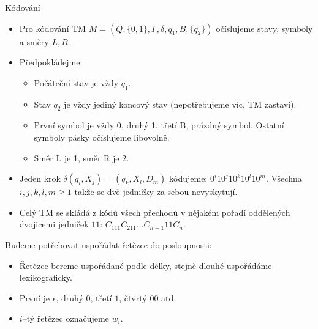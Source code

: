     
    \begin{frame}{Kódování}
    
    \begin{itemize}[<+->]
        \item Pro kódování TM $M=(Q,\{0,1\},\Gamma, \delta,q_1,B,\{q_2\})$ očíslujeme stavy, symboly a směry $L,R$.
    \item Předpokládejme:
    \begin{itemize}
        \item Počáteční stav je vždy $q_1$.
        \item Stav $q_2$ je vždy jediný koncový stav (nepotřebujeme víc, TM zastaví).
        \item První symbol je vždy 0, druhý 1, třetí B, prázdný symbol. Ostatní symboly pásky očíslujeme libovolně.
        \item Směr L je 1, směr R je 2.
    \end{itemize}
    \item Jeden krok $\delta(q_i,X_j)=(q_k,X_l,D_m)$ kódujeme: $0^i10^j10^k10^l10^m$. Všechna $i,j,k,l,m\geq 1$ takže se dvě jedničky za sebou nevyskytují.
    \item Celý TM se skládá z kódů všech přechodů v nějakém pořadí oddělených dvojicemi jedniček $11$: $C_111C_211\ldots C_{n-1}11C_n$.
    \end{itemize}\pause
    Budeme potřebovat uspořádat řetězce do posloupnosti:
    \begin{itemize}[<+->]
        \item Řetězce bereme uspořádané podle délky, stejně dlouhé uspořádáme lexikograficky.
    \item První je $\epsilon$, druhý $0$, třetí $1$, čtvrtý $00$ atd.
    \item $i$--tý řetězec označujeme $w_i$.
    \end{itemize}
    
    \end{frame}
    
